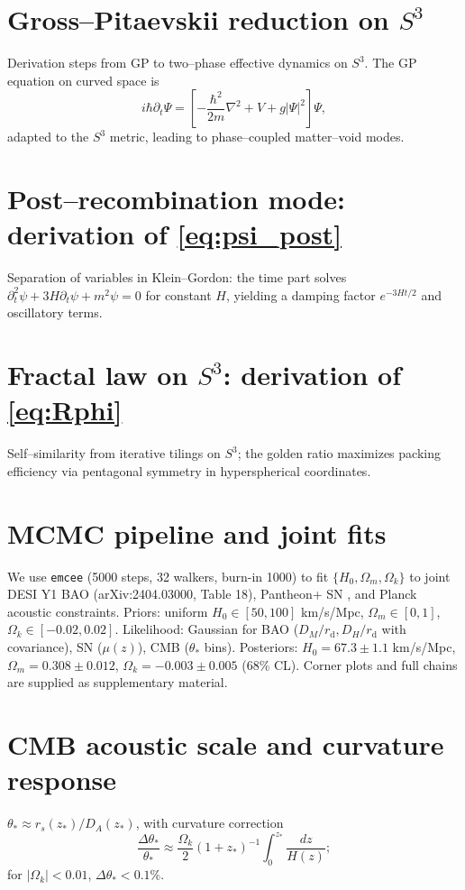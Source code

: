 \documentclass[aps,prd,twocolumn,superscriptaddress,preprintnumbers,amsmath,amssymb,floatfix]{revtex4-2}
\newcommand{\Sthree}{S^{3}}
\newcommand{\rd}{r_{\mathrm{d}}}
\newcommand{\Omk}{\Omega_k}
\newcommand{\Om}{\Omega_m}
\begin{document}
\appendix

\section{Gross--Pitaevskii reduction on $\Sthree$}\label{app:GP}
Derivation steps from GP to two--phase effective dynamics on $\Sthree$. The GP equation on curved space is
\[
i \hbar \partial_t \Psi = \left[ -\frac{\hbar^2}{2m} \nabla^2 + V + g |\Psi|^2 \right] \Psi,
\]
adapted to the $\Sthree$ metric, leading to phase--coupled matter--void modes.

\section{Post--recombination mode: derivation of \texorpdfstring{\eqref{eq:psi_post}}{(8)}}\label{app:post}
Separation of variables in Klein--Gordon: the time part solves $\partial_t^2 \psi + 3H \partial_t \psi + m^2 \psi = 0$ for constant $H$, yielding a damping factor $e^{-3Ht /2}$ and oscillatory terms.

\section{Fractal law on $\Sthree$: derivation of \texorpdfstring{\eqref{eq:Rphi}}{(10)}}\label{app:fractal}
Self--similarity from iterative tilings on $\Sthree$; the golden ratio maximizes packing efficiency via pentagonal symmetry in hyperspherical coordinates.

\section{MCMC pipeline and joint fits}\label{app:mcmc}
We use \texttt{emcee} (5000 steps, 32 walkers, burn-in 1000) to fit $\{H_0, \Om, \Omk\}$ to joint DESI Y1 BAO (arXiv:2404.03000, Table 18), Pantheon+ SN \cite{Pantheon2022}, and Planck acoustic constraints. Priors: uniform $H_0 \in [50,100]$ km/s/Mpc, $\Om \in [0,1]$, $\Omk \in [-0.02,0.02]$. Likelihood: Gaussian for BAO ($D_M/\rd, D_H/\rd$ with covariance), SN ($\mu(z)$), CMB ($\theta_*$ bins). Posteriors: $H_0 = 67.3 \pm 1.1$ km/s/Mpc, $\Om = 0.308 \pm 0.012$, $\Omk = -0.003 \pm 0.005$ (68\% CL). Corner plots and full chains are supplied as supplementary material.

\section{CMB acoustic scale and curvature response}\label{app:cmb}
$\theta_* \approx r_s(z_*) / D_A(z_*)$, with curvature correction
\[
\frac{\Delta \theta_*}{\theta_*} \approx \frac{\Omk}{2} (1+z_*)^{-1} \int_0^{z_*} \frac{dz}{H(z)} ;
\]
for $|\Omk|<0.01$, $\Delta \theta_* < 0.1\%$.
\end{document}
